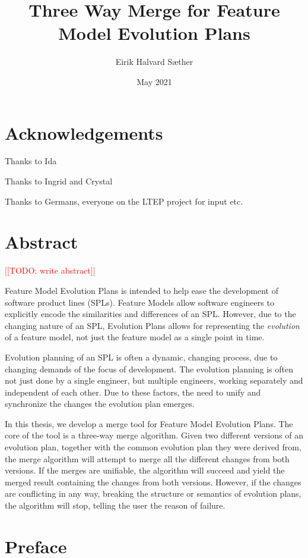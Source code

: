 \documentclass[a4paper,english]{ifimaster}
\title{Three Way Merge for Feature Model Evolution Plans}
\date{May 2021}
\author{Eirik Halvard Sæther}
\newcommand{\todo}[1]{\textcolor{red}{[[TODO: #1]]}\PackageWarning{TODO:}{#1!}}
\begin{document}
\duoforside[dept={Department of Informatics},
program={Informatics: Programming and Systems Architecture},
long]

\frontmatter{}

\chapter*{Acknowledgements}

Thanks to Ida

Thanks to Ingrid and Crystal

Thanks to Germans, everyone on the LTEP project for input etc.

\chapter*{Abstract}

\todo{write abstract}

Feature Model Evolution Plans is intended to help ease the development of software product lines (SPLs). Feature Models allow software engineers to explicitly encode the similarities and differences of an SPL. However, due to the changing nature of an SPL, Evolution Plans allows for representing the \textit{evolution} of a feature model, not just the feature model as a single point in time.

Evolution planning of an SPL is often a dynamic, changing process, due to changing demands of the focus of development. The evolution planning is often not just done by a single engineer, but multiple engineers, working separately and independent of each other. Due to these factors, the need to unify and synchronize the changes the evolution plan emerges.

In this thesis, we develop a merge tool for Feature Model Evolution Plans. The core of the tool is a three-way merge algorithm. Given two different versions of an evolution plan, together with the common evolution plan they were derived from, the merge algorithm will attempt to merge all the different changes from both versions. If the merges are unifiable, the algorithm will succeed and yield the merged result containing the changes from both versions. However, if the changes are conflicting in any way, breaking the structure or semantics of evolution plans, the algorithm will stop, telling the user the reason of failure.

\tableofcontents{}
\listoffigures{}
\listoftables{}

\chapter*{Preface}
\end{document}
